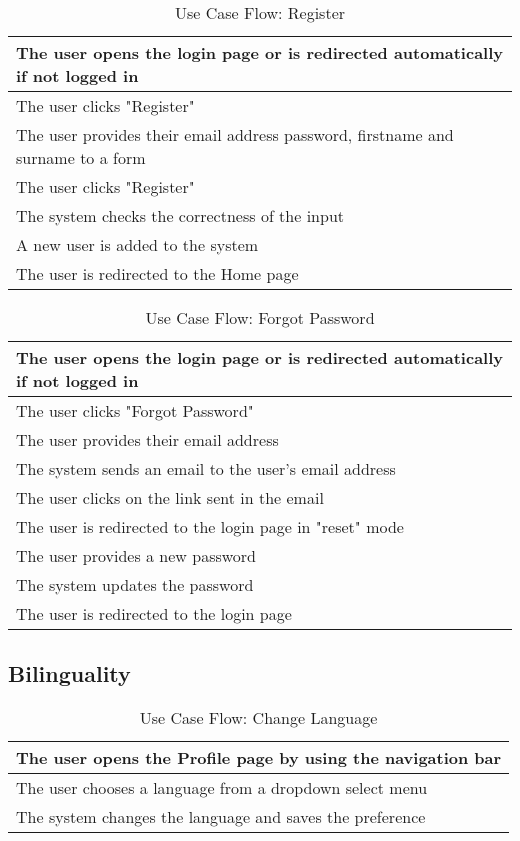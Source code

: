 \begin{table}[H]
  \begin{tabularx}{\linewidth}{|X|}
    \hline
     The user opens the login page or is redirected automatically if not logged in \\
     \hline
     The user clicks "Register" \\
     \hline
     The user provides their email address password, firstname and surname to a form \\
     \hline
     The user clicks "Register" \\
     \hline
     The system checks the correctness of the input \\
     \hline
     A new user is added to the system \\
     \hline
     The user is redirected to the Home page \\
     \hline 
  \end{tabularx}
  \caption{Use Case Flow: Register}
\end{table}

\begin{table}[H]
  \begin{tabularx}{\linewidth}{|X|}
    \hline
     The user opens the login page or is redirected automatically if not logged in \\
     \hline
     The user clicks "Forgot Password" \\
     \hline
     The user provides their email address \\
     \hline
     The system sends an email to the user's email address \\
     \hline
     The user clicks on the link sent in the email \\
     \hline
     The user is redirected to the login page in "reset" mode \\
     \hline
     The user provides a new password \\
     \hline
     The system updates the password \\
     \hline 
     The user is redirected to the login page \\
     \hline 
  \end{tabularx}
  \caption{Use Case Flow: Forgot Password}
\end{table}

\subsection{Bilinguality}
\begin{table}[H]
  \begin{tabularx}{\linewidth}{|X|}
    \hline
     The user opens the Profile page by using the navigation bar \\
     \hline
     The user chooses a language from a dropdown select menu \\
     \hline
     The system changes the language and saves the preference \\
     \hline 
  \end{tabularx}
  \caption{Use Case Flow: Change Language}
\end{table}

